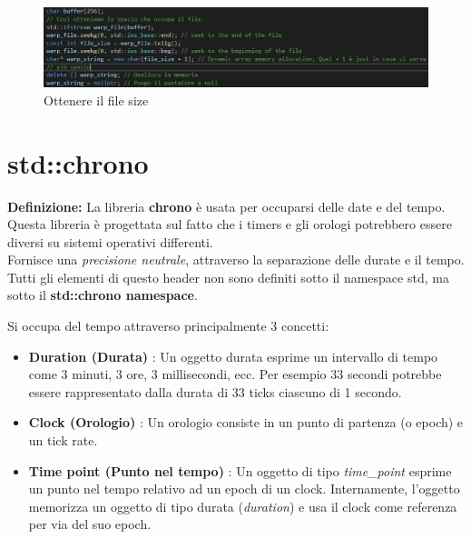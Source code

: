 \begin{figure}[ht]
	\centering
	\includegraphics[width=1\textwidth, height=1\textheight, keepaspectratio]{./imgs/fstream_file_size2.png}
	\caption{Ottenere il file size}
	\label{fig:fstream_file_size2}
\end{figure}


\newpage

\section{std::chrono}

\textsf{\small \textbf{Definizione: } La libreria \textbf{chrono} è usata per occuparsi delle date e del tempo. Questa libreria è progettata sul fatto che i timers e gli orologi potrebbero essere diversi su sistemi operativi differenti.} \\

\textsf{\small Fornisce una \emph{precisione neutrale}, attraverso la separazione delle durate e il tempo.} \\

\textsf{\small Tutti gli elementi di questo header non sono definiti sotto il namespace std, ma sotto il \textbf{std::chrono namespace}.} \break

\textsf{\small Si occupa del tempo attraverso principalmente 3 concetti: } \\

\begin{itemize}
	\item \textsf{\small \textbf{Duration (Durata)} : Un oggetto durata esprime un intervallo di tempo come 3 minuti, 3 ore, 3 millisecondi, ecc. Per esempio 33 secondi potrebbe essere rappresentato dalla durata di 33 ticks ciascuno di 1 secondo.}
	\item \textsf{\small \textbf{Clock (Orologio)} : Un orologio consiste in un punto di partenza (o epoch) e un tick rate.}
	\item \textsf{\small \textbf{Time point (Punto nel tempo)} : Un oggetto di tipo \emph{time\_point} esprime un punto nel tempo relativo ad un epoch di un clock. Internamente, l'oggetto memorizza un oggetto di tipo durata (\emph{duration}) e usa il clock come referenza per via del suo epoch.}
\end{itemize}

